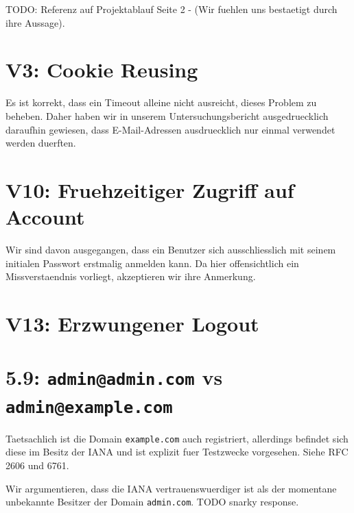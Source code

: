 \documentclass[12pt,DIV14,BCOR10mm,a4paper,parskip=half-,headsepline,headinclude,english,ngerman,bibliography=totocnumbered]{scrreprt}
\begin{document}
TODO: Referenz auf Projektablauf Seite 2 - (Wir fuehlen uns bestaetigt durch ihre Aussage).

\section{V3: Cookie Reusing}

Es ist korrekt, dass ein Timeout alleine nicht ausreicht, dieses Problem zu beheben.
Daher haben wir in unserem Untersuchungsbericht ausgedruecklich daraufhin gewiesen, dass E-Mail-Adressen ausdruecklich nur einmal verwendet werden duerften.

\section{V10: Fruehzeitiger Zugriff auf Account}

Wir sind davon ausgegangen, dass ein Benutzer sich ausschliesslich mit seinem initialen Passwort erstmalig anmelden kann.
Da hier offensichtlich ein Missverstaendnis vorliegt, akzeptieren wir ihre Anmerkung.

\section{V13: Erzwungener Logout}

\section{5.9: \texttt{admin@admin.com} vs \texttt{admin@example.com}}

Taetsachlich ist die Domain \texttt{example.com} auch registriert, allerdings befindet sich diese im Besitz der IANA und ist explizit fuer Testzwecke vorgesehen.
Siehe RFC 2606 und 6761.

Wir argumentieren, dass die IANA vertrauenswuerdiger ist als der momentane unbekannte Besitzer der Domain \texttt{admin.com}.
TODO snarky response.

\printbibliography

\printacronyms[title=Abkürzungsverzeichnis,toctitle=Abkürzungsverzeichnis]
\printglossary[title=Glossar,toctitle=Glossar,type=main]

\iftotalfigures
  \listoffigures
\fi

\end{document}
